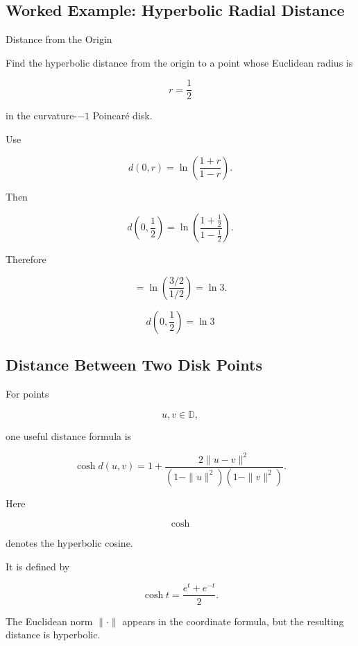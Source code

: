 \subsection{Worked Example: Hyperbolic Radial Distance}
\label{subsec:worked-hyperbolic-radial-distance}

\begin{workedexamplebox}{Distance from the Origin}

Find the hyperbolic distance from the origin to a point whose Euclidean
radius is

\[
r=\frac12
\]

in the curvature-\(-1\) Poincar\'e disk.

Use

\[
d(0,r)
=
\ln\left(\frac{1+r}{1-r}\right).
\]

Then

\[
d\left(0,\frac12\right)
=
\ln
\left(
\frac{1+\frac12}{1-\frac12}
\right).
\]

Therefore

\[
=
\ln\left(\frac{3/2}{1/2}\right)
=
\ln3.
\]

\begin{answerbox}
\[
\boxed{
d\left(0,\frac12\right)=\ln3
}
\]
\end{answerbox}
\end{workedexamplebox}

\subsection{Distance Between Two Disk Points}
\label{subsec:hyperbolic-distance-disk}

For points

\[
u,v\in\mathbb{D},
\]

one useful distance formula is

\[
\boxed{
\cosh d(u,v)
=
1+
\frac{2\|u-v\|^2}
{(1-\|u\|^2)(1-\|v\|^2)}.
}
\]

Here

\[
\cosh
\]

denotes the hyperbolic cosine.

It is defined by

\[
\boxed{
\cosh t=\frac{e^t+e^{-t}}{2}.
}
\]

The Euclidean norm \(\|\cdot\|\) appears in the coordinate formula, but the
resulting distance is hyperbolic.

